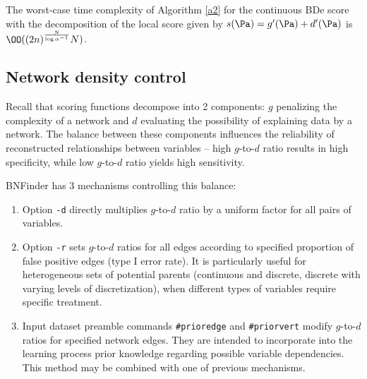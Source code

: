  \begin{theorem}
 The worst-case time complexity of Algorithm \ref{a2} for the continuous BDe score with the decomposition of the local score given by $s(\Pa)=g'(\Pa)+d'(\Pa)$ is $\OO((2n)^\frac{N}{\log\alpha^{-1}}N)$.
 \end{theorem}
 
 \subsection{Network density control}

Recall that scoring functions decompose into 2 components: 
$g$ penalizing the complexity of a network and 
$d$ evaluating the possibility of explaining data by a network.
The balance between these components influences 
the reliability of reconstructed relationships between variables --
high $g$-to-$d$ ratio results in high specificity, 
while low $g$-to-$d$ ratio yields high sensitivity.

BNFinder has 3 mechanisms controlling this balance:
\begin{enumerate}
\item Option \verb$-d$ directly multiplies $g$-to-$d$ ratio by 
a uniform factor for all pairs of variables.
\item Option \verb$-r$ sets $g$-to-$d$ ratios for all edges
according to specified proportion of false positive edges
(type I error rate). 
It is particularly useful for heterogeneous sets of potential parents
(continuous and discrete, discrete with varying levels of discretization),
when different types of variables require specific treatment.
\item Input dataset preamble commands \verb$#prioredge$ and \verb$#priorvert$
modify $g$-to-$d$ ratios for specified network edges.
They are intended to incorporate into the learning process 
prior knowledge regarding possible variable dependencies.
This method may be combined with one of previous mechanisms.
\end{enumerate}

